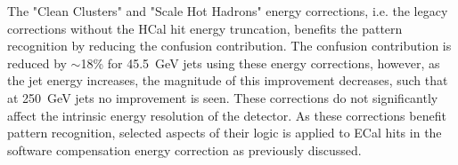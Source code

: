 The "Clean Clusters" and "Scale Hot Hadrons" energy corrections, i.e. the legacy corrections without the HCal hit energy truncation, benefits the pattern recognition by reducing the confusion contribution.  The confusion contribution is reduced by $\sim$18\% for 45.5~GeV jets using these energy corrections, however, as the jet energy increases, the magnitude of this improvement decreases, such that at 250~GeV jets no improvement is seen.  These corrections do not significantly affect the intrinsic energy resolution of the detector.  As these corrections benefit pattern recognition, selected aspects of their logic is applied to ECal hits in the software compensation energy correction as previously discussed.

\begin{figure}[h!]

\end{figure}
